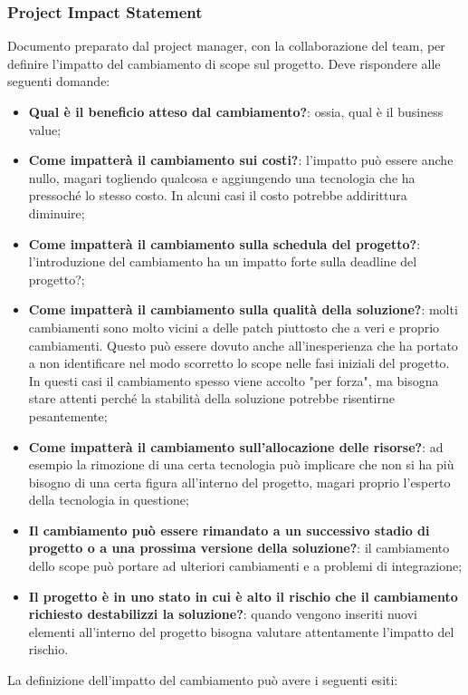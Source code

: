 \subsubsection{Project Impact Statement}
Documento preparato dal project manager, con la collaborazione del team, per definire l’impatto del cambiamento di scope sul progetto.
Deve rispondere alle seguenti domande:
\begin{itemize}
	\item \textbf{Qual è il beneficio atteso dal cambiamento?}: ossia, qual è il business value;
	\item \textbf{Come impatterà il cambiamento sui costi?}: l'impatto può essere anche nullo, magari togliendo qualcosa e aggiungendo una tecnologia che ha pressoché lo stesso costo. In alcuni casi il costo potrebbe addirittura diminuire;
	\item \textbf{Come impatterà il cambiamento sulla schedula del progetto?}: l'introduzione del cambiamento ha un impatto forte sulla deadline del progetto?;
	\item \textbf{Come impatterà il cambiamento sulla qualità della soluzione?}: molti cambiamenti sono molto vicini a delle patch piuttosto che a veri e proprio cambiamenti. Questo può essere dovuto anche all'inesperienza che ha portato a non identificare nel modo scorretto lo scope nelle fasi iniziali del progetto. In questi casi il cambiamento spesso viene accolto "per forza", ma bisogna stare attenti perché la stabilità della soluzione potrebbe risentirne pesantemente;
	\item \textbf{Come impatterà il cambiamento sull’allocazione delle risorse?}: ad esempio la rimozione di una certa tecnologia può implicare che non si ha più bisogno di una certa figura all'interno del progetto, magari proprio l'esperto della tecnologia in questione;
	\item \textbf{Il cambiamento può essere rimandato a un successivo stadio di progetto o a una prossima versione della soluzione?}: il cambiamento dello scope può portare ad ulteriori cambiamenti e a problemi di integrazione;
	\item \textbf{Il progetto è in uno stato in cui è alto il rischio che il cambiamento richiesto destabilizzi la soluzione?}: quando vengono inseriti nuovi elementi all'interno del progetto bisogna valutare attentamente l'impatto del rischio.
\end{itemize}
La definizione dell’impatto del cambiamento può avere i seguenti esiti:
